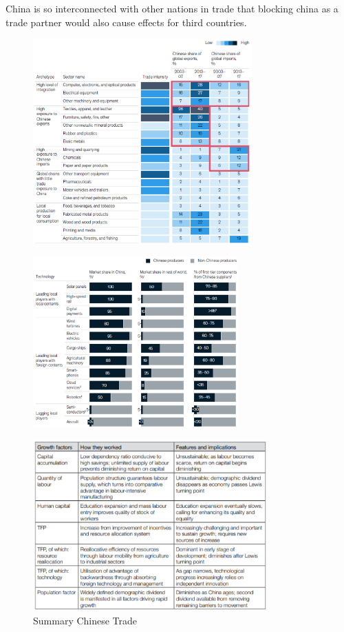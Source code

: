 China is so interconnected with other nations in trade that blocking china
as a trade partner would also cause effects for third countries.

\begin{figure}[H]
    \centering
    \includegraphics[width=0.75\textwidth]{Pictures/china_trade_1.png}
\end{figure}

\begin{figure}[H]
    \centering
    \includegraphics[width=0.7\textwidth]{Pictures/china_trade_2.png}
\end{figure}

\begin{figure}[H]
    \centering
    \includegraphics[width=0.8\textwidth]{Pictures/china_trade_summary.png}
    \caption{Summary Chinese Trade}
\end{figure}

